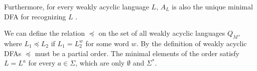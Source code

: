 Furthermore, for every weakly acyclic language $L$, $A_{L}$ is also the unique minimal DFA for recognizing $L$ \cite[Proposition~9]{blondin_24}. 
\par
We can define the relation $\preceq$ on the set of all weakly acyclic languages $Q_{M}$, where $L_{1} \preceq L_{2}$ if $L_{1} = L_{2}^{w}$ for some word $w$. By the definition of weakly acyclic DFAs $\preceq$ must be a partial order. The minimal elements of the order satisfy $L = L^{a}$ for every $a \in \Sigma$, which are only $\emptyset$ and $\Sigma^{*}$.



